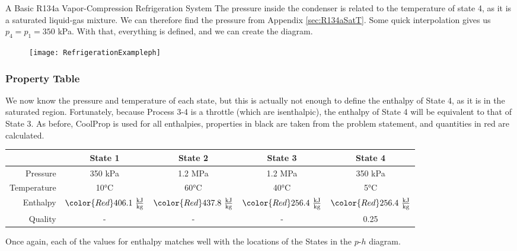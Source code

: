 \begin{example}[label=ex:ch4_refrigeration]{A Basic R134a Vapor-Compression Refrigeration System}
  The pressure inside the condenser is related to the temperature of state 4, as it is a saturated liquid-gas mixture.  We can therefore find the pressure from Appendix \ref{sec:R134aSatT}.  Some quick interpolation gives us $p_4 = p_1 = 350$ kPa.  With that, everything is defined, and we can create the diagram.

  \begin{figure}[H]
    \centering
    \texttt{[image: RefrigerationExampleph]}
  \end{figure}

  \subsubsection*{Property Table}

  We now know the pressure and temperature of each state, but this is actually not enough to define the enthalpy of State 4, as it is in the saturated region.  Fortunately, because Process 3-4 is a throttle (which are isenthalpic), the enthalpy of State 4 will be equivalent to that of State 3.  As before, CoolProp is used for all enthalpies, properties in black are taken from the problem statement, and quantities in red are calculated.

  \begin{table}[H]
    \centering
    \def\arraystretch{1.5}
    \begin{tabular}{r|cccc}
      & State 1 & State 2 & State 3 & State 4 \\ \hline
      Pressure    & {\color{Red} 350 kPa}  & 1.2 MPa  &  1.2 MPa &  {\color{Red} 350 kPa}       \\
      Temperature & 10°C   & 60°C &  40°C   & 5°C  \\
      Enthalpy    & $\color{Red} 406.1\ \frac{\rm kJ}{\rm kg}$ & $\color{Red} 437.8\ \frac{\rm kJ}{\rm kg}$ & $\color{Red} 256.4\ \frac{\rm kJ}{\rm kg}$ & $\color{Red} 256.4\ \frac{\rm kJ}{\rm kg}$ \\
      Quality     & -       & -     &   -      &  0.25
    \end{tabular}
    \def\arraystretch{1.0}
  \end{table}

  Once again, each of the values for enthalpy matches well with the locations of the States in the $p$-$h$ diagram.


\end{example}

